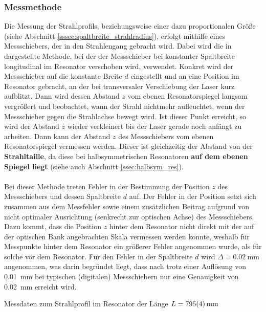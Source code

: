 \documentclass[11pt, a4paper]{article}
\numberwithin{equation}{section}
\begin{document}
\subsubsection{Messmethode}
Die Messung der Strahlprofils, beziehungsweise einer dazu proportionalen Größe (siehe Abschnitt \ref{sssec:spaltbreite_strahlradius}), erfolgt mithilfe eines Messschiebers, der in den Strahlengang gebracht wird.
Dabei wird die in \cite{anleitung} dargestellte Methode, bei der der Messschieber bei konstanter Spaltbreite longitudinal im Resonator verschoben wird, verwendet.
Konkret wird der Messschieber auf die konstante Breite $d$ eingestellt und an eine Position im Resonator gebracht, an der bei transversaler Verschiebung der Laser kurz aufblitzt.
Dann wird dessen Abstand $z$ vom ebenen Resonatorspiegel langsam vergrößert und beobachtet, wann der Strahl nichtmehr aufleuchtet, wenn der Messschieber gegen die Strahlachse bewegt wird.
Ist dieser Punkt erreicht, so wird der Abstand $z$ wieder verkleinert bis der Laser gerade noch anfängt zu arbeiten.
Dann kann der Abstand $z$ des Messschiebers vom ebenen Resonatorspiegel vermessen werden.
Dieser ist gleichzeitig der Abstand von der \textbf{Strahltaille}, da diese bei halbsymmetrischen Resonatoren \textbf{auf dem ebenen Spiegel liegt} (siehe auch Abschnitt \ref{ssec:halbsym_res}).\\
\\
Bei dieser Methode treten Fehler in der Bestimmung der Position $z$ des Messschiebers und dessen Spaltbreite $d$ auf.
Der Fehler in der Position setzt sich zusammen aus dem Messfehler sowie einem zusätzlichen Beitrag aufgrund von nicht optimaler Ausrichtung (senkrecht zur optischen Achse) des Messschiebers.
Dazu kommt, dass die Position $z$ hinter dem Resonator nicht direkt mit der auf der optischen Bank angebrachten Skala vermessen werden konnte, weshalb für Messpunkte hinter dem Resonator ein größerer Fehler angenommen wurde, als für solche vor dem Resonator.
Für den Fehler in der Spaltbreite $d$ wird $\Delta = \SI{0.02}{\milli\metre}$ angenommen, was darin begründet liegt, dass nach \cite{messschieber_katalog} trotz einer Auflösung von \SI{0.01}{\milli\metre} bei typischen (digitalen) Messschiebern nur eine Genauigkeit von \SI{0.02}{\milli\metre} erreicht wird.
\begin{table}[h]
	\centering
	
	\caption{Messdaten zum Strahlprofil im Resonator der Länge $L = \SI{795 +- 4}{\milli\metre}$}
	\label{tab:ex_messdaten_strahlprofil}
\end{table}
\end{document}
